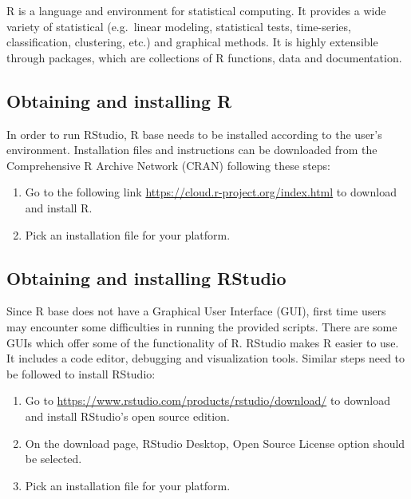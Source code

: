\documentclass[
  10pt,
  b5paper,
]{book}
\providecommand{\tightlist}{%
  \setlength{\itemsep}{0pt}\setlength{\parskip}{0pt}}
\begin{document}
R is a language and environment for statistical computing. It provides a wide variety of statistical (e.g.~linear modeling, statistical tests, time-series, classification, clustering, etc.) and graphical methods. It is highly extensible through packages, which are collections of R functions, data and documentation.

\hypertarget{obtaining-and-installing-r}{%
\subsection{Obtaining and installing R}\label{obtaining-and-installing-r}}

In order to run RStudio, R base needs to be installed according to the user's environment. Installation files and instructions can be downloaded from the Comprehensive R Archive Network (CRAN) following these steps:

\begin{enumerate}
\def\labelenumi{\arabic{enumi}.}
\tightlist
\item
  Go to the following link \url{https://cloud.r-project.org/index.html} to download and install R.
\item
  Pick an installation file for your platform.
\end{enumerate}

\hypertarget{obtaining-and-installing-rstudio}{%
\subsection{Obtaining and installing RStudio}\label{obtaining-and-installing-rstudio}}

Since R base does not have a Graphical User Interface (GUI), first time users may encounter some difficulties in running the provided scripts. There are some GUIs which offer some of the functionality of R. RStudio makes R easier to use. It includes a code editor, debugging and visualization tools. Similar steps need to be followed to install RStudio:

\begin{enumerate}
\def\labelenumi{\arabic{enumi}.}
\tightlist
\item
  Go to \url{https://www.rstudio.com/products/rstudio/download/} to download and install RStudio's open source edition.
\item
  On the download page, RStudio Desktop, Open Source License option should be selected.
\item
  Pick an installation file for your platform.
\end{enumerate}
\end{document}
